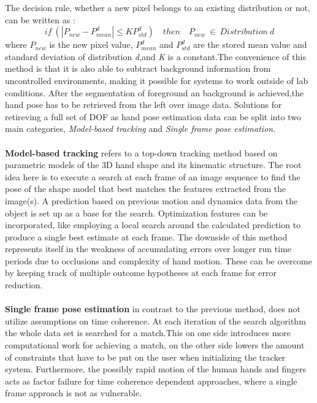 The decision rule, whether a new pixel belongs to an existing distribution or not, can be written as \cite{Kristensen.Feb.2007}:
\begin{equation}
 if\ (|P_{new} −P^{d}_{mean}|\leq KP^{d}_{std})\quad then \quad P_{new}\  \in\ Distribution\ d
\end{equation}
where $P_{new}$ is the new pixel value, $P^{d}_{mean}$ and $P^{d}_{std}$ are the stored mean value and standard deviation of distribution \textit{d},and \textit{K} is a constant.The convenience of this method is that it is also able to subtract background information from uncontrolled environments, making it possible for systems to work outside of lab conditions.
After the segmentation of foreground an background is achieved,the hand pose has to be retrieved from the left over image data. Solutions for retireving a full set of DOF as hand pose estimation data can be split into two main categories\cite{Erol.2007}, \textit{Model-based tracking} and \textit{Single frame pose estimation}.\\\\
\textbf{Model-based tracking} refers to a top-down tracking method based on parametric models of the 3D hand shape and its kinematic structure. The root idea here is to execute a search at each frame of an image sequence to find the pose of the shape model that best matches the features extracted from the image(s). A prediction based on previous motion and dynamics data from the object is set up as a base for the search. Optimization features can be incorporated, like employing a local search around the calculated prediction to produce a single best estimate at each frame. The downside of this method represents itself in the weakness of accumulating errors over longer run time periods due to occlusions and complexity of hand motion. These can be overcome by keeping track of multiple outcome hypotheses at each frame for error reduction.
\\\\
\textbf{Single frame pose estimation} in contrast to the previous method, does not utilize assumptions on time coherence. At each iteration of the search algorithm the whole data set is searched for a match.This on one side introduces more computational work for achieving a match, on the other side lowers the amount of constraints that have to be put on the user when initializing the tracker system. Furthermore, the possibly rapid motion of the human hands and fingers acts as factor failure for time coherence dependent approaches, where a single frame approach is not as vulnerable.